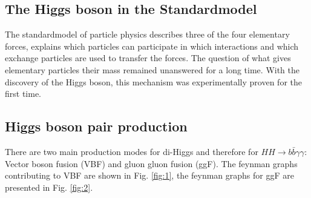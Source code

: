 \label{sec:theory}

\subsection{The Higgs boson in the Standardmodel}

The standardmodel of particle physics describes three of the four elementary forces, explains which particles can participate in which interactions and which exchange particles are
used to transfer the forces. The question of what gives elementary particles their mass remained unanswered for a long time. With the discovery of the Higgs boson, this mechanism was
experimentally proven for the first time. \\






\subsection{Higgs boson pair production}
\label{sec:sig_processes}

There are two main production modes for di-Higgs and therefore for $HH \rightarrow b \bar{b} \gamma \gamma$: Vector boson fusion (VBF) and gluon gluon fusion (ggF). 
The feynman graphs contributing to VBF are shown in Fig. \ref{fig:1}, the feynman graphs for ggF are presented in Fig. \ref{fig:2}. \\

